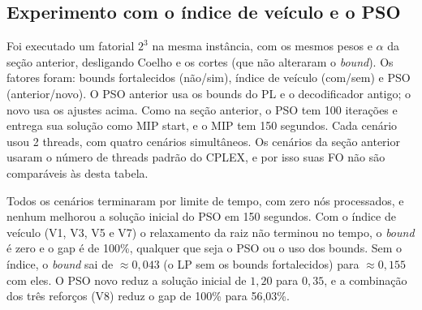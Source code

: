\documentclass[11pt,a4paper]{article}
\begin{document}
\subsection{Experimento com o índice de veículo e o PSO}

Foi executado um fatorial $2^3$ na mesma instância, com os mesmos pesos e
$\alpha$ da seção anterior, desligando Coelho e os cortes (que não alteraram o
\emph{bound}). Os fatores foram: bounds fortalecidos (não/sim), índice de
veículo (com/sem) e PSO (anterior/novo). O PSO anterior usa os bounds do PL e o
decodificador antigo; o novo usa os ajustes acima. Como na seção anterior, o PSO
tem 100 iterações e entrega sua solução como MIP start, e o MIP tem 150
segundos. Cada cenário usou 2 threads, com quatro cenários simultâneos. Os
cenários da seção anterior usaram o número de threads padrão do CPLEX, e por
isso suas FO não são comparáveis às desta tabela.

\begin{center}
\small
{}%
\end{center}

Todos os cenários terminaram por limite de tempo, com zero nós processados, e
nenhum melhorou a solução inicial do PSO em 150 segundos. Com o índice de
veículo (V1, V3, V5 e V7) o relaxamento da raiz não terminou no tempo, o
\emph{bound} é zero e o gap é de 100\%, qualquer que seja o PSO ou o uso dos
bounds. Sem o índice, o \emph{bound} sai de $\approx0{,}043$ (o LP sem os bounds
fortalecidos) para $\approx0{,}155$ com eles. O PSO novo reduz a solução
inicial de $1{,}20$ para $0{,}35$, e a combinação dos três reforços (V8) reduz o
gap de 100\% para 56,03\%.
\end{document}
